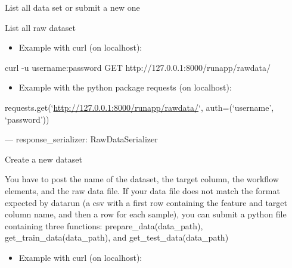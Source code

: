 \documentclass[letterpaper,10pt,english]{sphinxmanual}
\begin{document}

\begin{fulllineitems}
\label{modules/views:runapp.views.RawDataList}
List all data set or submit a new one

\begin{fulllineitems}
\label{modules/views:runapp.views.RawDataList.get}
List all raw dataset
\begin{itemize}
\item {} 
Example with curl (on localhost):

\end{itemize}

curl -u username:password GET http://127.0.0.1:8000/runapp/rawdata/
\begin{itemize}
\item {} 
Example with the python package requests (on localhost):

\end{itemize}

requests.get(`\url{http://127.0.0.1:8000/runapp/rawdata/}`,            auth=(`username', `password'))

---
response\_serializer: RawDataSerializer

\end{fulllineitems}


\begin{fulllineitems}
\label{modules/views:runapp.views.RawDataList.post}
Create a new dataset

You have to post the name of the dataset, the target column,        the workflow elements, and the raw data file. If your data file does        not match the format expected by datarun (a csv with a first row            containing the feature and target column name, and then a row for            each sample), you can submit a python file containing three            functions: prepare\_data(data\_path), get\_train\_data(data\_path),            and get\_test\_data(data\_path)
\begin{itemize}
\item {} 
Example with curl (on localhost):
\begin{quote}


\end{quote}
\end{itemize}
\end{fulllineitems}
\end{fulllineitems}
\end{document}
